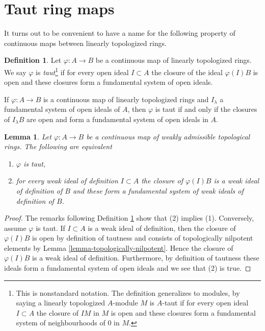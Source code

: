 \documentclass{stacks-project}
\theoremstyle{plain}
\newtheorem{lemma}[subsection]{Lemma}
\theoremstyle{definition}
\newtheorem{definition}[subsection]{Definition}
\theoremstyle{remark}
\numberwithin{equation}{subsection}
\begin{document}
\section{Taut ring maps}
\label{section-taut-ring-maps}

\noindent
It turns out to be convenient to have a name for the following property
of continuous maps between linearly topologized rings.

\begin{definition}
\label{definition-taut}
Let $\varphi : A \to B$ be a continuous map of linearly topologized rings.
We say $\varphi$ is {\it taut}\footnote{This is nonstandard notation.
The definition generalizes to modules, by saying a linearly topologized
$A$-module $M$ is $A$-taut if for every open ideal $I \subset A$ the closure
of $IM$ in $M$ is open and these closures form a fundamental system of
neighbourhoods of $0$ in $M$.}
if for every open ideal $I \subset A$ the closure of the ideal $\varphi(I)B$
is open and these closures form a fundamental system of open ideals.
\end{definition}

\noindent
If $\varphi : A \to B$ is a continuous map of linearly topologized rings
and $I_\lambda$ a fundamental system of open ideals of $A$, then $\varphi$
is taut if and only if
the closures of $I_\lambda B$ are open and form a fundamental
system of open ideals in $A$.

\begin{lemma}
\label{lemma-taut-weakly-admissible}
Let $\varphi : A \to B$ be a continuous map of weakly admissible topological
rings. The following are equivalent
\begin{enumerate}
\item $\varphi$ is taut,
\item for every weak ideal of definition $I \subset A$ the closure of
$\varphi(I)B$ is a weak ideal of definition of $B$ and these form a
fundamental system of weak ideals of definition of $B$.
\end{enumerate}
\end{lemma}

\begin{proof}
The remarks following Definition \ref{definition-taut} show that
(2) implies (1). Conversely, assume $\varphi$ is taut. If $I \subset A$
is a weak ideal of definition, then the closure of $\varphi(I)B$
is open by definition of tautness and consists of topologically
nilpotent elements by Lemma \ref{lemma-topologically-nilpotent}.
Hence the closure of $\varphi(I)B$ is a weak ideal of definition.
Furthermore, by definition of tautness these ideals form a
fundamental system of open ideals and we see that (2) is true.
\end{proof}
\end{document}
